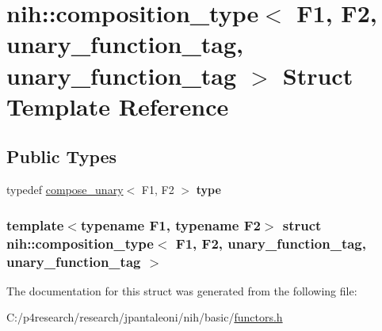 \hypertarget{structnih_1_1composition__type_3_01_f1_00_01_f2_00_01unary__function__tag_00_01unary__function__tag_01_4}{
\section{nih\-:\-:composition\-\_\-type$<$ \-F1, \-F2, unary\-\_\-function\-\_\-tag, unary\-\_\-function\-\_\-tag $>$ \-Struct \-Template \-Reference}
\label{structnih_1_1composition__type_3_01_f1_00_01_f2_00_01unary__function__tag_00_01unary__function__tag_01_4}
}
\subsection*{\-Public \-Types}
\begin{DoxyCompactItemize}
\item 
\hypertarget{structnih_1_1composition__type_3_01_f1_00_01_f2_00_01unary__function__tag_00_01unary__function__tag_01_4_a6f9fd8242602e25a28e2c0f4b84c972b}{
typedef \hyperlink{structnih_1_1compose__unary}{compose\-\_\-unary}$<$ \-F1, \-F2 $>$ {\bfseries type}}
\label{structnih_1_1composition__type_3_01_f1_00_01_f2_00_01unary__function__tag_00_01unary__function__tag_01_4_a6f9fd8242602e25a28e2c0f4b84c972b}

\end{DoxyCompactItemize}
\subsubsection*{template$<$typename F1, typename F2$>$ struct nih\-::composition\-\_\-type$<$ F1, F2, unary\-\_\-function\-\_\-tag, unary\-\_\-function\-\_\-tag $>$}



\-The documentation for this struct was generated from the following file\-:\begin{DoxyCompactItemize}
\item 
\-C\-:/p4research/research/jpantaleoni/nih/basic/\hyperlink{functors_8h}{functors.\-h}\end{DoxyCompactItemize}
